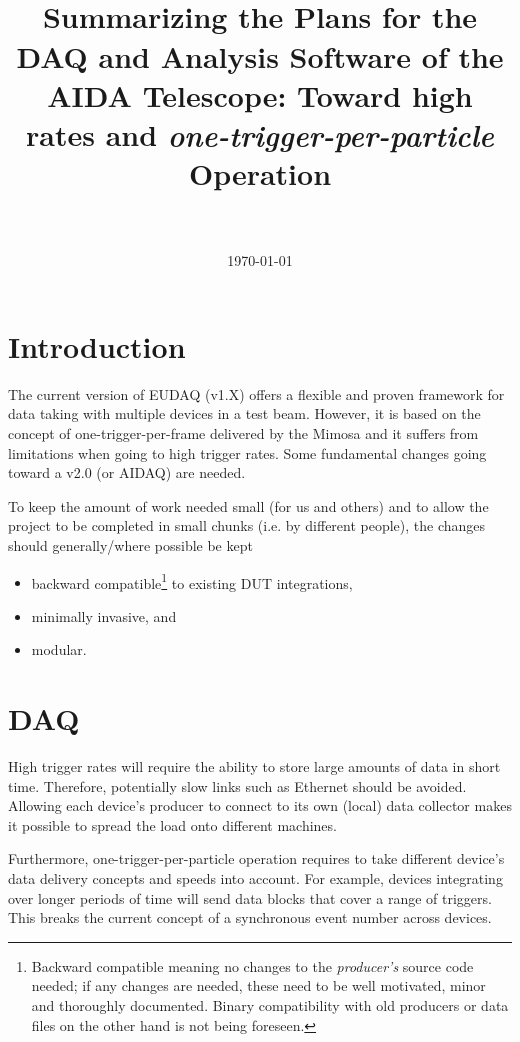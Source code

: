 \documentclass[paper=a4, fontsize=11pt]{scrartcl}	%
\title{
		\usefont{OT1}{bch}{b}{n}
		\horrule{0.5pt} \\[0.4cm]
		\huge Summarizing the Plans for the DAQ and
                Analysis Software of the AIDA Telescope: Toward high
                rates and
                \textit{one-trigger-per-particle} Operation\\
		\horrule{2pt} \\[0.5cm]
}
\author{}
\date{\today}
\numberwithin{equation}{section}		%
\numberwithin{figure}{section}			%
\numberwithin{table}{section}				%
\begin{document}
 

\maketitle
\section{Introduction}
The current version of EUDAQ (v1.X) offers a flexible and proven
framework for data taking with multiple devices in a test
beam. However, it is based on the concept of one-trigger-per-frame
delivered by the Mimosa and it suffers from limitations when going to
high trigger rates. Some fundamental changes going toward a v2.0 (or
AIDAQ) are needed.

To keep the amount of work needed small (for us and others) and to allow the project to
be completed in small chunks (i.e. by different people), the changes
should generally/where possible be kept
\begin{itemize}
\item backward compatible\footnote{Backward compatible meaning no
    changes to the \emph{producer's} source code needed; if any
    changes are needed, these need to be well motivated, minor and
    thoroughly documented. Binary compatibility with old producers or
    data files on the other hand is not being foreseen.} to existing DUT integrations,
\item minimally invasive, and
\item modular.
\end{itemize}

\section{DAQ}
\label{sec:daq}
High trigger rates will require the ability to store large amounts of
data in short time. Therefore, potentially slow links such as Ethernet
should be avoided. Allowing each device's producer to connect to its
own (local) data collector makes it possible to spread the load onto
different machines.

Furthermore, one-trigger-per-particle operation requires to take
different device's data delivery concepts and speeds into
account. For example, devices integrating over longer periods of time
will send data blocks that cover a range of triggers. This breaks the
current concept of a synchronous event number across devices.
\end{document}
